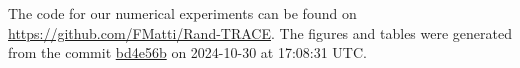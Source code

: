 The code for our numerical experiments can be found on \url{https://github.com/FMatti/Rand-TRACE}. The figures and tables were generated from the commit \href{https://github.com/FMatti/Rand-TRACE/tree/bd4e56b}{bd4e56b} on 2024-10-30 at 17:08:31 UTC.
